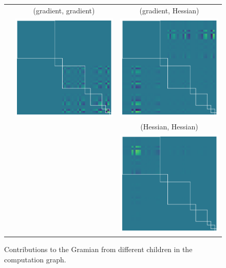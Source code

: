 \begin{figure}
\begin{tabular}{ccc}
    \\
    &
      (gradient, gradient)
    &
      (gradient, Hessian)
    \\
    &
      \includegraphics[width=0.33\linewidth]{../kfac_pinns_exp/exp04_gramian_contributions/fig/gram_grad_input_grad_input.png}
    &
      \includegraphics[width=0.33\linewidth]{../kfac_pinns_exp/exp04_gramian_contributions/fig/gram_grad_input_hess_input.png}
    \\
    &
    &
      (Hessian, Hessian)
    \\
    &
    &
      \includegraphics[width=0.33\linewidth]{../kfac_pinns_exp/exp04_gramian_contributions/fig/gram_hess_input_hess_input.png}
  \end{tabular}
  \caption{Contributions to the Gramian from different children in the
    computation graph.}\label{fig:gramian-contribution-children}
\end{figure}

